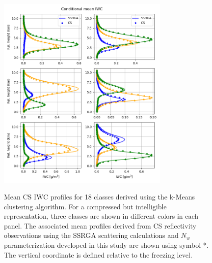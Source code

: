 \documentclass{ametsocV6.1}
\begin{document}
\begin{figure}[t]
    \centering
    \includegraphics[width=0.75\textwidth,angle=0]{./Figs/fig01.png}\\
    \caption{Mean CS IWC profiles for 18 classes derived using the k-Means clustering algorithm. For a 
    compressed but intelligible representation, three classes are shown in different colors in each panel.
    The associated 
    mean profiles derived from CS reflectivity observations using the SSRGA scattering calculations 
    and $N_w$ parameterization developed in this study are shown using symbol *. The vertical coordinate 
    is defined relative to the freezing level.}\label{f1}
\end{figure}
\end{document}
